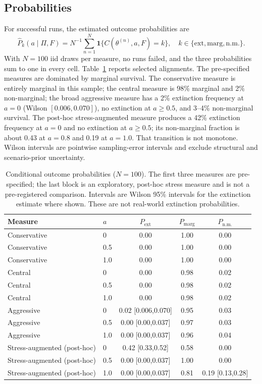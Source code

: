 \documentclass[11pt]{article}
\begin{document}
\subsection{Probabilities}
For successful runs, the estimated outcome probabilities are
\begin{equation}
\widehat P_k(a\mid\Pi,F)=N^{-1}\sum_{n=1}^N\mathbf{1}\{C(\theta^{(n)},a,F)=k\},
\quad k\in\{\mathrm{ext},\mathrm{marg},\mathrm{n.m.}\}.
\label{eq:prob}
\end{equation}
With $N=100$ iid draws per measure, no runs failed, and the three probabilities sum to one in every cell. Table~\ref{tab:prob} reports selected alignments. The pre-specified measures are dominated by marginal survival. The conservative measure is entirely marginal in this sample; the central measure is 98\% marginal and 2\% non-marginal; the broad aggressive measure has a 2\% extinction frequency at $a=0$ (Wilson $[0.006,0.070]$), no extinction at $a\ge0.5$, and 3--4\% non-marginal survival. The post-hoc stress-augmented measure produces a 42\% extinction frequency at $a=0$ and no extinction at $a\ge0.5$; its non-marginal fraction is about 0.43 at $a=0.8$ and 0.19 at $a=1.0$. That transition is not monotone. Wilson intervals are pointwise sampling-error intervals and exclude structural and scenario-prior uncertainty.

\begin{table}[t]
\centering
\caption{Conditional outcome probabilities ($N=100$). The first three measures are pre-specified; the last block is an exploratory, post-hoc stress measure and is not a pre-registered comparison. Intervals are Wilson 95\% intervals for the extinction estimate where shown. These are not real-world extinction probabilities.}
\label{tab:prob}
\begin{tabular}{llccc}
\toprule
Measure & $a$ & $P_{\mathrm{ext}}$ & $P_{\mathrm{marg}}$ & $P_{\mathrm{n.m.}}$\\
\midrule
Conservative & 0 & 0.00 & 1.00 & 0.00\\
Conservative & 0.5 & 0.00 & 1.00 & 0.00\\
Conservative & 1.0 & 0.00 & 1.00 & 0.00\\
Central & 0 & 0.00 & 0.98 & 0.02\\
Central & 0.5 & 0.00 & 0.98 & 0.02\\
Central & 1.0 & 0.00 & 0.98 & 0.02\\
Aggressive & 0 & 0.02 [0.006,0.070] & 0.95 & 0.03\\
Aggressive & 0.5 & 0.00 [0.00,0.037] & 0.97 & 0.03\\
Aggressive & 1.0 & 0.00 [0.00,0.037] & 0.96 & 0.04\\
\midrule
Stress-augmented (post-hoc) & 0 & 0.42 [0.33,0.52] & 0.58 & 0.00\\
Stress-augmented (post-hoc) & 0.5 & 0.00 [0.00,0.037] & 1.00 & 0.00\\
Stress-augmented (post-hoc) & 1.0 & 0.00 [0.00,0.037] & 0.81 & 0.19 [0.13,0.28]\\
\bottomrule
\end{tabular}
\end{table}
\end{document}
